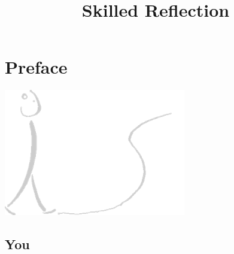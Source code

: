 \documentclass[
]{book}
\title{Skilled Reflection}
\author{}
\date{\vspace{-2.5em}}
\begin{document}
\maketitle

{
\setcounter{tocdepth}{1}
\tableofcontents
}
\hypertarget{preface}{%
\chapter*{Preface}\label{preface}}

\begin{center}\includegraphics{figs/sr_gray_transp} \end{center}

\hypertarget{you}{%
\section{You}\label{you}}
\end{document}
